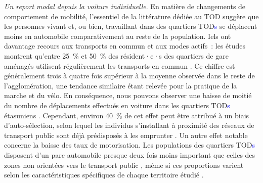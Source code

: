 \begin{refsegment}
\textsl{Un report modal depuis la voiture individuelle}. En matière de changements de comportement de mobilité, l'essentiel de la littérature dédiée au \acrshort{TOD} suggère que les personnes vivant et, ou bien, travaillant dans des quartiers \acrshort{TOD}\textcolor{blue}{s} se déplacent moins en automobile comparativement au reste de la population. Iels ont davantage recours aux transports en commun et aux modes actifs~: les études montrent qu’entre 25~\% et 50~\% des résident·e·s des quartiers de gare aménagés utilisent régulièrement les transports en commun \textcolor{blue}{\autocites[61]{lund_travel_2004}[40]{evans_transit-oriented_2007}[5, 15]{cervero_vehicle_2008}[62]{kamruzzaman_advance_2014}[152]{kamruzzaman_patterns_2014}}. Ce chiffre est généralement trois à quatre fois supérieur à la moyenne observée dans le reste de l’agglomération, une tendance similaire étant relevée pour la pratique de la marche et du vélo. En conséquence, nous pouvons observer une baisse de moitié du nombre de déplacements effectués en voiture dans les quartiers \acrshort{TOD}\textcolor{blue}{s} étasuniens \textcolor{blue}{\autocite[14]{cervero_vehicle_2008}}. Cependant, environ 40~\% de cet effet peut être attribué à un biais d’auto-sélection, selon lequel les individus s’installant à proximité des réseaux de transport public sont déjà prédisposés à les emprunter \textcolor{blue}{\autocites[2~082]{cervero_transit-oriented_2007}[50]{laham_nonwork_2017}}. Un autre effet notable concerne la baisse des taux de motorisation. Les populations des quartiers \acrshort{TOD}\textcolor{blue}{s} disposent d’un parc automobile presque deux fois moins important que celles des zones non orientées vers le transport public \textcolor{blue}{\autocite[50]{arrington_effects_2008}}, même si ces proportions varient selon les caractéristiques spécifiques de chaque territoire étudié \textcolor{blue}{\autocite[79]{lund_travel_2004}}.%


\end{refsegment}
